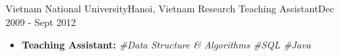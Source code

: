
\resumeSubheading
{Vietnam National University}{Hanoi, Vietnam}
{Research Teaching Assistant}{Dec 2009 - Sept 2012}
\begin{itemize}
    \item \textbf{Teaching Assistant:} \emph{\#Data Structure \& Algorithms \#SQL \#Java}
\end{itemize}

\resumeSubHeadingListEnd